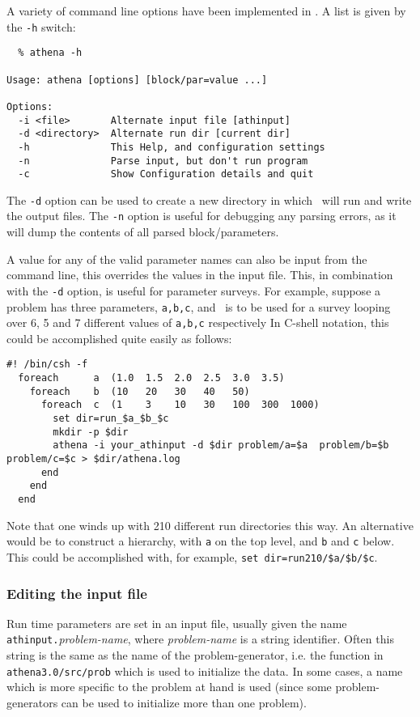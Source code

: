 A variety of command line options have been implemented in \ath.
A list is given by the {\tt -h} switch:
\footnotesize
\begin{verbatim}
  % athena -h

Usage: athena [options] [block/par=value ...]

Options:
  -i <file>       Alternate input file [athinput]
  -d <directory>  Alternate run dir [current dir]
  -h              This Help, and configuration settings
  -n              Parse input, but don't run program
  -c              Show Configuration details and quit

\end{verbatim}
\normalsize
The {\tt -d} option can be used to create a new directory in which
\ath\ will run and write the output files.  The {\tt -n} option is
useful for debugging any parsing errors, as it will dump the contents
of all parsed block/parameters.

A value for any of the valid parameter names can also be input from
the command line, this overrides the values in the input file.
This, in combination with the {\tt -d} option, is
useful for parameter surveys.  For example, 
suppose a problem has three parameters, {\tt a,b,c}, and \ath\
is to be used for a survey looping over
6, 5 and 7 different values of  {\tt a,b,c} respectively
In C-shell notation, this could be accomplished quite easily as follows:
\footnotesize
\begin{verbatim}
#! /bin/csh -f
  foreach      a  (1.0  1.5  2.0  2.5  3.0  3.5)
    foreach    b  (10   20   30   40   50)
      foreach  c  (1    3    10   30   100  300  1000)
        set dir=run_$a_$b_$c
        mkdir -p $dir
        athena -i your_athinput -d $dir problem/a=$a  problem/b=$b  problem/c=$c > $dir/athena.log
      end
    end
  end
\end{verbatim}   %
\normalsize
Note that one winds up with 210 different run directories this way.
An alternative
would be to construct a hierarchy, with {\tt a} on the top level, and
{\tt b} and {\tt c} below. This could be accomplished with, for example,
{\tt set dir=run210/\$a/\$b/\$c}.

\subsubsection{Editing the input file}

Run time parameters are set in an input file, usually given the name
{\tt athinput.}{\it problem-name}, where {\it problem-name} is a
string identifier.  Often this string is the same as the name of the
problem-generator, i.e. the function in {\tt athena3.0/src/prob} which is used to
initialize the data.  In some cases, a name which is more specific to
the problem at hand is used (since some problem-generators can be used
to initialize more than one problem).

